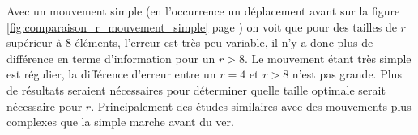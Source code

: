 Avec un mouvement simple (en l'occurrence un déplacement avant sur la figure
\ref{fig:comparaison_r_mouvement_simple} page
\pageref{fig:comparaison_r_mouvement_simple}) on voit que pour des tailles de $r$
supérieur à 8 éléments, l'erreur est très peu variable, il n'y a donc plus de différence
en terme d'information pour un $r > 8$. Le mouvement étant très simple est régulier,
la différence d'erreur entre un $r = 4$ et $r > 8$ n'est pas grande. 
Plus de résultats seraient nécessaires pour déterminer quelle taille optimale serait
nécessaire pour $r$. Principalement des études similaires avec des mouvements plus complexes
que la simple marche avant du ver.



%




